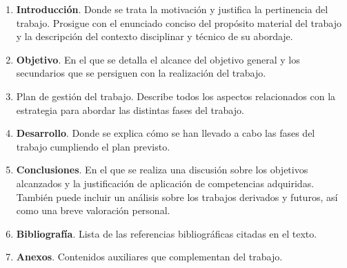 \begin{enumerate}
\item \textbf{Introducción}. Donde se trata la motivación y justifica la pertinencia del trabajo. Prosigue con el enunciado conciso del propósito material del trabajo y la descripción del contexto disciplinar y técnico de su abordaje.

\item \textbf{Objetivo}. En el que se detalla el alcance del objetivo general y los secundarios que se persiguen con la realización del trabajo.

\item Plan de gestión del trabajo. Describe todos los aspectos relacionados con la estrategia para abordar las distintas fases del trabajo. 

\item \textbf{Desarrollo}. Donde se explica cómo se han llevado a cabo las fases del trabajo cumpliendo el plan previsto.

\item \textbf{Conclusiones}. En el que se realiza una discusión sobre los objetivos alcanzados y la justificación de aplicación de competencias adquiridas. También puede incluir un análisis sobre los trabajos derivados y futuros, así como una breve valoración personal.

\item \textbf{Bibliografía}. Lista de las referencias bibliográficas citadas en el texto.

\item \textbf{Anexos}. Contenidos auxiliares que complementan del trabajo.
\end{enumerate}









